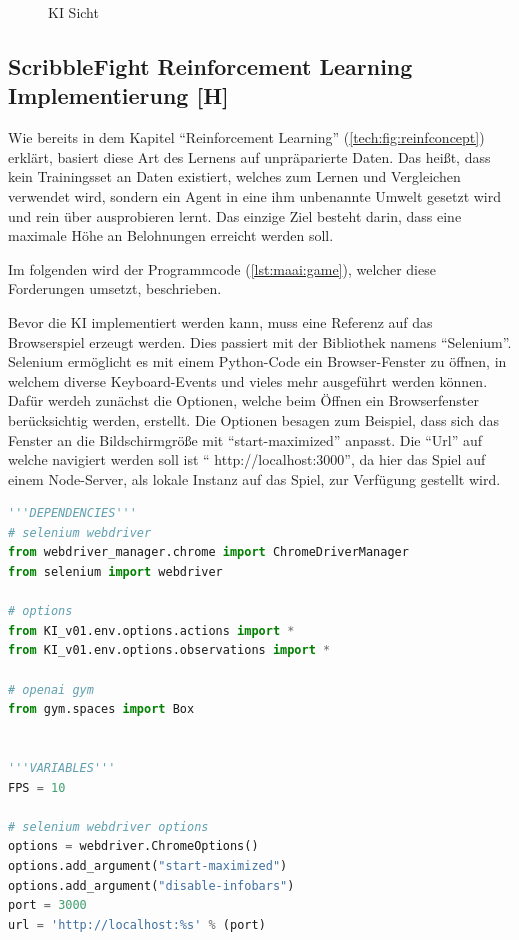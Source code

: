 \begin{figure}[H]
\begin{minipage}[t]{0.45\linewidth}
    \caption{KI Sicht}
    \label{maai:ai:visCopy:output}
  \end{minipage}
\end{figure}

\subsection{ScribbleFight Reinforcement Learning Implementierung [H]}
Wie bereits in dem Kapitel ``Reinforcement Learning'' (\ref{tech:fig:reinfconcept}) erklärt, basiert diese Art des Lernens auf unpräparierte Daten. Das heißt, dass kein Trainingsset an Daten existiert, welches zum Lernen und Vergleichen verwendet wird, sondern ein Agent in eine ihm unbenannte Umwelt gesetzt wird und rein über ausprobieren lernt. Das einzige Ziel besteht darin, dass eine maximale Höhe an Belohnungen erreicht werden soll.

Im folgenden wird der Programmcode (\ref{lst:maai:game}), welcher diese Forderungen umsetzt, beschrieben.

Bevor die KI implementiert werden kann, muss eine Referenz auf das Browserspiel erzeugt werden. Dies passiert mit der Bibliothek namens ``Selenium''. Selenium ermöglicht es mit einem Python-Code ein Browser-Fenster zu öffnen, in welchem diverse Keyboard-Events und vieles mehr ausgeführt werden können. Dafür werdeh zunächst die Optionen, welche beim Öffnen ein Browserfenster berücksichtig werden, erstellt. Die Optionen besagen zum Beispiel, dass sich das Fenster an die Bildschirmgröße mit ``start-maximized'' anpasst. Die ``Url'' auf welche navigiert werden soll ist `` http://localhost:3000'', da hier das Spiel auf einem Node-Server, als lokale Instanz auf das Spiel, zur Verfügung gestellt wird.

\begin{lstlisting}[language=Python,label=lst:maai:game,caption=Implementation der Logik der Reinforcement Learning KI]
'''DEPENDENCIES'''
# selenium webdriver
from webdriver_manager.chrome import ChromeDriverManager
from selenium import webdriver

# options
from KI_v01.env.options.actions import *
from KI_v01.env.options.observations import *

# openai gym
from gym.spaces import Box


'''VARIABLES'''
FPS = 10

# selenium webdriver options
options = webdriver.ChromeOptions()
options.add_argument("start-maximized")
options.add_argument("disable-infobars")
port = 3000
url = 'http://localhost:%s' % (port)

\end{lstlisting}

